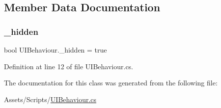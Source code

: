 \subsection{Member Data Documentation}
\mbox{\label{class_u_i_behaviour_a0421d4dc2987f0c48b88cc6175d993e5}} 
\subsubsection{\texorpdfstring{\_hidden}{\_hidden}}
{\footnotesize\ttfamily bool U\+I\+Behaviour.\+\_\+hidden = true\hspace{0.3cm}{\ttfamily [protected]}}



Definition at line 12 of file U\+I\+Behaviour.\+cs.



The documentation for this class was generated from the following file\+:\begin{DoxyCompactItemize}
\item 
Assets/\+Scripts/\mbox{\hyperlink{_u_i_behaviour_8cs}{U\+I\+Behaviour.\+cs}}\end{DoxyCompactItemize}
